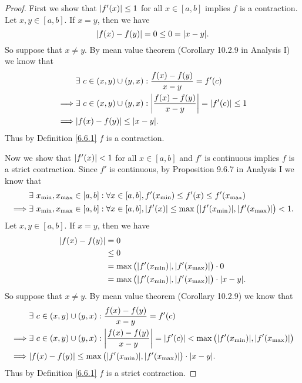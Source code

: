 \begin{proof}
    First we show that \(\abs*{f'(x)} \leq 1\) for all \(x \in [a, b]\) implies \(f\) is a contraction.
    Let \(x, y \in [a, b]\).
    If \(x = y\), then we have
    \[
        \abs*{f(x) - f(y)} = 0 \leq 0 = \abs*{x - y}.
    \]
    So suppose that \(x \neq y\).
    By mean value theorem (Corollary 10.2.9 in Analysis I) we know that
    \begin{align*}
                 & \exists\ c \in (x, y) \cup (y, x) : \frac{f(x) - f(y)}{x - y} = f'(c)                      \\
        \implies & \exists\ c \in (x, y) \cup (y, x) : \abs*{\frac{f(x) - f(y)}{x - y}} = \abs*{f'(c)} \leq 1 \\
        \implies & \abs*{f(x) - f(y)} \leq \abs{x - y}.
    \end{align*}
    Thus by Definition \ref{6.6.1} \(f\) is a contraction.

    Now we show that \(\abs*{f'(x)} < 1\) for all \(x \in [a, b]\) and \(f'\) is continuous implies \(f\) is a strict contraction.
    Since \(f'\) is continuous, by Proposition 9.6.7 in Analysis I we know that
    \begin{align*}
                 & \exists\ x_{\min}, x_{\max} \in [a, b] : \forall x \in [a, b], f'(x_{\min}) \leq f'(x) \leq f'(x_{\max})                                     \\
        \implies & \exists\ x_{\min}, x_{\max} \in [a, b] : \forall x \in [a, b], \abs*{f'(x)} \leq \max\big(\abs*{f'(x_{\min})}, \abs*{f'(x_{\max})}\big) < 1.
    \end{align*}
    Let \(x, y \in [a, b]\).
    If \(x = y\), then we have
    \begin{align*}
        \abs*{f(x) - f(y)} & = 0                                                                          \\
                           & \leq 0                                                                       \\
                           & = \max\big(\abs*{f'(x_{\min})}, \abs*{f'(x_{\max})}\big) \cdot 0             \\
                           & = \max\big(\abs*{f'(x_{\min})}, \abs*{f'(x_{\max})}\big) \cdot \abs*{x - y}.
    \end{align*}
    So suppose that \(x \neq y\).
    By mean value theorem (Corollary 10.2.9) we know that
    \begin{align*}
                 & \exists\ c \in (x, y) \cup (y, x) : \frac{f(x) - f(y)}{x - y} = f'(c)                                                                        \\
        \implies & \exists\ c \in (x, y) \cup (y, x) : \abs*{\frac{f(x) - f(y)}{x - y}} = \abs*{f'(c)} < \max\big(\abs*{f'(x_{\min})}, \abs*{f'(x_{\max})}\big) \\
        \implies & \abs*{f(x) - f(y)} \leq \max\big(\abs*{f'(x_{\min})}, \abs*{f'(x_{\max})}\big) \cdot \abs{x - y}.
    \end{align*}
    Thus by Definition \ref{6.6.1} \(f\) is a strict contraction.
\end{proof}

